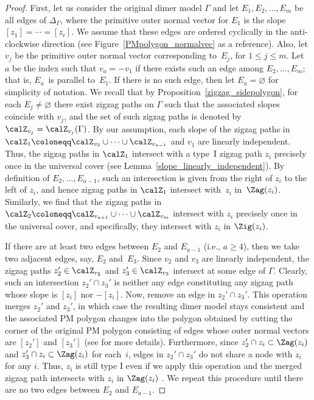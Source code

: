\begin{proof}
First, let us consider the original dimer model $\Gamma$ and let $E_1,E_2,\dots,E_m$ be all edges of $\Delta_\Gamma$, where the primitive outer normal vector for $E_1$ is the slope $[z_1]=\cdots=[z_r]$.
We assume that these edges are ordered cyclically in the anti-clockwise direction (see Figure~\ref{PMpolygon_normalvec} as a reference).
Also, let $v_j$ be the primitive outer normal vector corresponding to~$E_j$, for $1 \leq j \leq m$.
Let~$a$ be the index such that $v_a=-v_1$ if there exists such an edge among $E_2,\dots,E_m$; that is, $E_a$~is parallel to~$E_1$.
If there is no such edge, then let $E_a= \varnothing$ for simplicity of notation.
We recall that by Proposition~\ref{zigzag_sidepolygon}, for each $E_j\neq\varnothing$ there exist zigzag paths on $\Gamma$ such that the associated slopes coincide with $v_j$, and the set of such zigzag paths is denoted by $\calZ_{v_j}=\calZ_{v_j}(\Gamma)$.
By our assumption, each slope of the zigzag paths in $\calZ_1\coloneqq\calZ_{v_2}\cup\cdots\cup\calZ_{v_{a-1}}$ and $v_1$ are linearly independent.
Thus, the zigzag paths in $\calZ_1$ intersect with a type~I zigzag path $z_i$ precisely once in the universal cover (see Lemma~\ref{slope_linearly_independent}).
By definition of $E_2,\dots,E_{a-1}$, such an intersection is given from the right of $z_i$ to the left of $z_i$,
and hence zigzag paths in $\calZ_1$ intersect with~$z_i$ in~$\Zag(z_i)$.
Similarly, we find that the zigzag paths in $\calZ_2\coloneqq\calZ_{v_{a+1}}\cup\cdots\cup\calZ_{v_m}$ intersect with $z_i$ precisely once in the universal cover, and specifically, they intersect with $z_i$ in $\Zig(z_i)$.

If there are at least two edges between $E_2$ and $E_{a-1}$ (i.e., $a \geq 4$),
then we take two adjacent edges, say, $E_2$ and~$E_3$.
Since $v_2$ and $v_3$ are linearly independent, the zigzag paths $z_2'\in\calZ_{v_2}$ and $z_3'\in\calZ_{v_3}$ intersect at some edge of $\Gamma$.
Clearly, such an intersection $z_2' \cap z_3'$ is neither any edge constituting any zigzag path whose slope is $[z_i]$ nor $-[z_i]$.
Now, remove an edge in $z_2' \cap z_3'$. This operation merges $z_2'$ and $z_3'$, in which case the resulting dimer model stays consistent and the associated PM polygon
changes into the polygon obtained by cutting the corner of the original PM polygon consisting of edges whose outer normal vectors are $[z_2']$ and $[z_3']$
(see \cite[Sections~5 and 6]{Gul} for more details).
Furthermore, since $z_2' \cap z_i \subset \Zag(z_i)$ and $z_3' \cap z_i \subset \Zag(z_i)$ for each~$i$, edges in $z_2' \cap z_3'$ do not share a node with $z_i$ for any $i$.
Thus, $z_i$ is still type I even if we apply this operation and the merged zigzag path intersects with $z_i$ in $\Zag(z_i)$ .
We repeat this procedure until there are no two edges between $E_2$ and $E_{a-1}$.


\end{proof}
